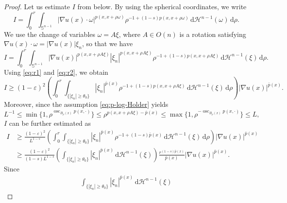 \documentclass[10pt,a4paper]{amsart}
\DeclareMathOperator{\osc}{osc}
\begin{document}
\begin{proof}
Let us estimate $I$ from below. By using the spherical coordinates, we write
\begin{equation*}
I = \int_{0}^{r} \int_{\mathbb{S}^{n-1}} |\nabla u(x) \cdot \omega|^{p(x, x+\rho \omega)} \rho^{-1+(1-s)p(x, x+\rho \omega)} \,\mathrm{d}\mathcal{H}^{n-1}(\omega) \,\mathrm{d}\rho.
\end{equation*}
We use the change of variables $\omega = A\xi$, where $A \in O(n)$ is a rotation satisfying $\nabla u(x) \cdot \omega = |\nabla u(x)| \xi_{n}$, so that we have
\begin{equation} \label{eq:I}
I = \int_{0}^{r} \int_{\mathbb{S}^{n-1}} |\nabla u(x)|^{p(x, x+\rho A\xi)} |\xi_{n}|^{p(x, x+\rho A \xi)} \rho^{-1+(1-s)p(x, x+\rho A\xi)} \,\mathrm{d}\mathcal{H}^{n-1}(\xi) \,\mathrm{d}\rho.
\end{equation}
Using \eqref{eq:r1} and \eqref{eq:r2}, we obtain
\begin{equation*}
I \geq (1-\varepsilon)^2 \left( \int_{0}^{r} \int_{\lbrace |\xi_{n}| \geq \theta_{0} \rbrace} |\xi_{n}|^{\bar{p}(x)} \rho^{-1+(1-s)p(x, x+\rho A\xi)} \,\mathrm{d}\mathcal{H}^{n-1}(\xi) \,\mathrm{d}\rho \right) |\nabla u(x)|^{\bar{p}(x)}.
\end{equation*}
Moreover, since the assumption \eqref{eq:p-log-Holder} yields
\begin{equation} \label{eq:log-Holder}
L^{-1} \leq \min\lbrace 1, \rho^{\osc_{B_{\rho}(x)}p(x, \cdot)} \rbrace \leq \rho^{p(x, x+\rho A\xi)-\bar{p}(x)} \leq \max\lbrace 1, \rho^{-\osc_{B_{\rho}(x)}p(x, \cdot)}\rbrace \leq L,
\end{equation}
$I$ can be further estimated as
\begin{equation*}
\begin{split}
I
&\geq \frac{(1-\varepsilon)^2}{L^{1-s}} \left( \int_{0}^{r} \int_{\lbrace |\xi_{n}| \geq \theta_{0} \rbrace} |\xi_{n}|^{\bar{p}(x)} \rho^{-1+(1-s) \bar{p}(x)} \,\mathrm{d}\mathcal{H}^{n-1}(\xi) \,\mathrm{d}\rho \right) |\nabla u(x)|^{\bar{p}(x)} \\
&\geq \frac{(1-\varepsilon)^2}{(1-s)L^{1-s}} \left( \int_{\lbrace |\xi_{n}| \geq \theta_{0} \rbrace} |\xi_{n}|^{\bar{p}(x)} \,\mathrm{d}\mathcal{H}^{n-1}(\xi) \right) \frac{r^{(1-s)\bar{p}(x)}}{\bar{p}(x)} |\nabla u(x)|^{\bar{p}(x)}.
\end{split}
\end{equation*}
Since
\begin{equation*}
\begin{split}
\int_{\lbrace |\xi_{n}| \geq \theta_{0} \rbrace} |\xi_{n}|^{\bar{p}(x)} \,\mathrm{d}\mathcal{H}^{n-1}(\xi)

\end{split}
\end{equation*}
\end{proof}
\end{document}

